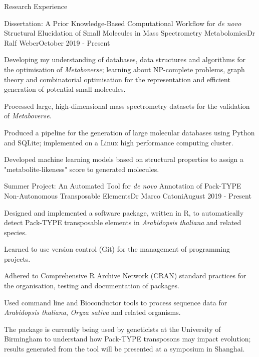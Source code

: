 \documentclass{resume}
\begin{document}
\begin{rSection}{Research Experience}

\begin{rSubsection}{Dissertation: A Prior Knowledge-Based Computational Workflow for \textit{de novo} Structural Elucidation of Small Molecules in Mass Spectrometry Metabolomics}{}{Dr Ralf Weber}{October 2019 - Present}

\item Developing my understanding of databases, data structures and algorithms for the optimisation of \textit{Metaboverse}; learning about NP-complete problems, graph theory and combinatorial optimisation for the representation and efficient generation of potential small molecules. 
\item Processed large, high-dimensional mass spectrometry datasets for the validation of \textit{Metaboverse}. 
\item Produced a pipeline for the generation of large molecular databases using Python and SQLite; implemented on a Linux high performance computing cluster.
\item Developed machine learning models based on structural properties to assign a "metabolite-likeness" score to generated molecules. 
\end{rSubsection}

\begin{rSubsection}{Summer Project: An Automated Tool for \textit{de novo} Annotation of Pack-TYPE Non-Autonomous Transposable Elements}{}{Dr Marco Catoni}{August 2019 - Present}

\item Designed and implemented a software package, written in R, to automatically detect Pack-TYPE transposable elements in \textit{Arabidopsis thaliana} and related species. 
\item Learned to use version control (Git) for the management of programming projects.
\item Adhered to Comprehensive R Archive Network (CRAN) standard practices for the organisation, testing and documentation of packages.
\item Used command line and Bioconductor tools to process sequence data for \textit{Arabidopsis thaliana}, \textit{Oryza sativa} and related organisms.
\item The package is currently being used by geneticists at the University of Birmingham to understand how Pack-TYPE transposons may impact evolution; results generated from the tool will be presented at a symposium in Shanghai.
\end{rSubsection}


\end{rSection}
\end{document}
